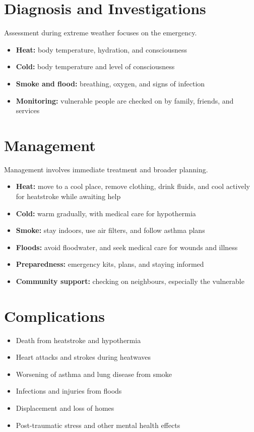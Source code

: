 \section*{Diagnosis and Investigations}
Assessment during extreme weather focuses on the emergency.
\begin{itemize}
    \item \textbf{Heat:} body temperature, hydration, and consciousness
    \item \textbf{Cold:} body temperature and level of consciousness
    \item \textbf{Smoke and flood:} breathing, oxygen, and signs of infection
    \item \textbf{Monitoring:} vulnerable people are checked on by family, friends, and services
\end{itemize}

\section*{Management}
Management involves immediate treatment and broader planning.
\begin{itemize}
    \item \textbf{Heat:} move to a cool place, remove clothing, drink fluids, and cool actively for heatstroke while awaiting help
    \item \textbf{Cold:} warm gradually, with medical care for hypothermia
    \item \textbf{Smoke:} stay indoors, use air filters, and follow asthma plans
    \item \textbf{Floods:} avoid floodwater, and seek medical care for wounds and illness
    \item \textbf{Preparedness:} emergency kits, plans, and staying informed
    \item \textbf{Community support:} checking on neighbours, especially the vulnerable
\end{itemize}

\section*{Complications}
\begin{itemize}
    \item Death from heatstroke and hypothermia
    \item Heart attacks and strokes during heatwaves
    \item Worsening of asthma and lung disease from smoke
    \item Infections and injuries from floods
    \item Displacement and loss of homes
    \item Post-traumatic stress and other mental health effects
\end{itemize}

